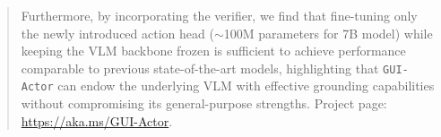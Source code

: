 \documentclass{article}
\newcommand{\sys}{\texttt{GUI-Actor}\xspace}
\renewcommand{\thefootnote}{\fnsymbol{footnote}}
\begin{document}
\begin{abstract}
    Furthermore, by incorporating the verifier, we find that fine-tuning only the newly introduced action head ($\sim$100M parameters for 7B model) while keeping the VLM backbone frozen is sufficient to achieve performance comparable to previous state-of-the-art models, highlighting that \sys can endow the underlying VLM with effective grounding capabilities without compromising its general-purpose strengths. Project page: \url{https://aka.ms/GUI-Actor}.
\end{abstract}
\renewcommand{\thefootnote}{\arabic{footnote}}  %












\end{document}
